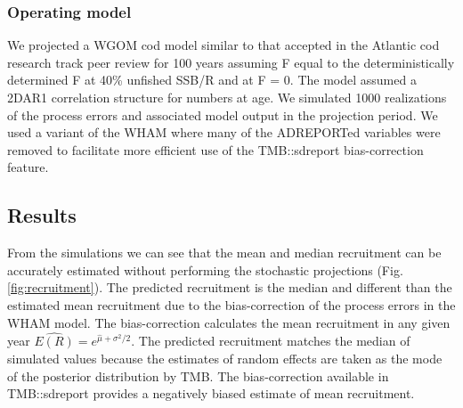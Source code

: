 \documentclass[
]{article}
\begin{document}
\hypertarget{operating-model}{%
\subsubsection*{Operating model}\label{operating-model}}

We projected a WGOM cod model similar to that accepted in the Atlantic cod research track peer review for 100 years assuming F equal to the deterministically determined F at 40\% unfished SSB/R and at F = 0. The model assumed a 2DAR1 correlation structure for numbers at age. We simulated 1000 realizations of the process errors and associated model output in the projection period. We used a variant of the WHAM where many of the ADREPORTed variables were removed to facilitate more efficient use of the TMB::sdreport bias-correction feature.

\hypertarget{results}{%
\subsection*{Results}\label{results}}

From the simulations we can see that the mean and median recruitment can be accurately estimated without performing the stochastic projections (Fig. \ref{fig:recruitment}). The predicted recruitment is the median and different than the estimated mean recruitment due to the bias-correction of the process errors in the WHAM model. The bias-correction calculates the mean recruitment in any given year \(\widehat {E(R)} = e^{\widehat \mu + \sigma^2/2}\). The predicted recruitment matches the median of simulated values because the estimates of random effects are taken as the mode of the posterior distribution by TMB. The bias-correction available in TMB::sdreport provides a negatively biased estimate of mean recruitment.
\end{document}
